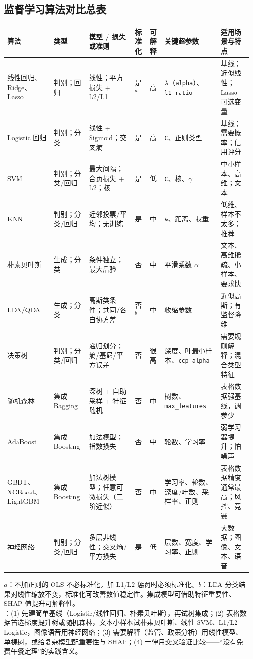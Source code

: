 \subsection{监督学习算法对比总表}
\begin{center}\footnotesize
\begin{tabularx}{\linewidth}{@{}p{1.75cm}p{1.45cm}p{3.1cm}p{0.75cm}p{0.6cm}p{2.6cm}L@{}}
\toprule
算法 & 类型 & 模型 / 损失或准则 & 标准化 & 可解释 & 关键超参数 & 适用场景与特点 \\
\midrule
线性回归、Ridge、Lasso & 判别；回归 & 线性；平方损失 + L2/L1 & 是$^a$ & 高 & $\lambda$（\texttt{alpha}）、\texttt{l1\_ratio} & 基线；近似线性；Lasso 可选变量 \\
Logistic 回归 & 判别；分类 & 线性 + Sigmoid；交叉熵 & 是 & 高 & \texttt{C}、正则类型 & 基线；需要概率；信用评分 \\
SVM & 判别；分类/回归 & 最大间隔；合页损失 + L2；核 & 是 & 低 & \texttt{C}、核、$\gamma$ & 中小样本、高维；文本 \\
KNN & 判别；分类/回归 & 近邻投票/平均；无训练 & 是 & 中 & $k$、距离、权重 & 低维、样本不太多；推荐 \\
朴素贝叶斯 & 生成；分类 & 条件独立；最大后验 & 否 & 中 & 平滑系数 $\alpha$ & 文本、高维稀疏、小样本、要求快 \\
LDA/QDA & 生成；分类 & 高斯类条件；共同/各自协方差 & 否$^b$ & 中 & 收缩参数 & 近似高斯；有监督降维 \\
决策树 & 判别；分类/回归 & 递归划分；熵/基尼/平方误差 & 否 & 很高 & 深度、叶最小样本、\texttt{ccp\_alpha} & 需要规则解释；混合类型特征 \\
随机森林 & 集成 Bagging & 深树 + 自助采样 + 特征随机 & 否 & 中 & 树数、\texttt{max\_features} & 表格数据强基线，调参少 \\
AdaBoost & 集成 Boosting & 加法模型；指数损失 & 否 & 中 & 轮数、学习率 & 弱学习器提升；怕噪声 \\
GBDT、XGBoost、LightGBM & 集成 Boosting & 加法树模型；任意可微损失（二阶近似） & 否 & 中 & 学习率、轮数、深度/叶数、采样率、正则 & 表格数据精度通常最高；风控、竞赛 \\
神经网络 & 判别；分类/回归 & 多层非线性；交叉熵/平方损失 & 是 & 低 & 层数、宽度、学习率、正则 & 大数据；图像、文本、语音 \\
\bottomrule
\end{tabularx}
\end{center}
{\footnotesize $a$：不加正则的 OLS 不必标准化，加 L1/L2 惩罚时必须标准化。$b$：LDA 分类结果对线性缩放不变，标准化可改善数值稳定性。集成模型可借助特征重要性、SHAP 值提升可解释性。}\\
：(1) 先建简单基线（Logistic/线性回归、朴素贝叶斯），再试树集成；(2) 表格数据首选梯度提升树或随机森林，文本小样本试朴素贝叶斯、线性 SVM、L1/L2-Logistic，图像语音用神经网络；(3) 需要解释（监管、政策分析）用线性模型、单棵树，或给复杂模型配重要性与 SHAP；(4) 一律用交叉验证比较——“没有免费午餐定理”的实践含义。

